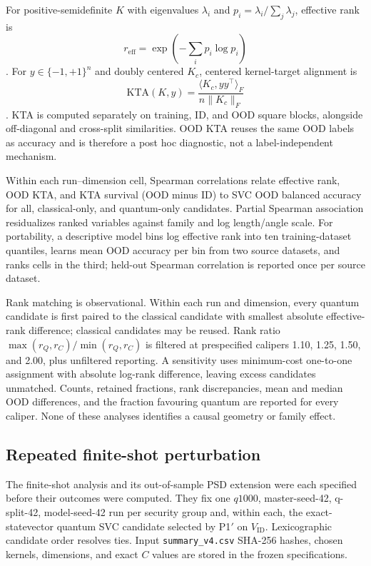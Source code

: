 \documentclass[referee,lineno,pdflatex,sn-nature]{sn-jnl}
\theoremstyle{thmstyleone}%
\theoremstyle{thmstyletwo}%
\theoremstyle{thmstylethree}%
\begin{document}
For positive-semidefinite $K$ with eigenvalues $\lambda_i$ and $p_i=\lambda_i/\sum_j\lambda_j$, effective rank is
\[
r_{\mathrm{eff}}=\exp\!\left(-\sum_i p_i\log p_i\right)
\]
\cite{roy2007effective}. For $y\in\{-1,+1\}^n$ and doubly centered $K_c$, centered kernel-target alignment is
\[
\mathrm{KTA}(K,y)=
\frac{\langle K_c,yy^\top\rangle_F}{n\|K_c\|_F}
\]
\cite{cristianini2001kta,cortes2012centeredalignment}. KTA is computed separately on training, ID, and OOD square blocks, alongside off-diagonal and cross-split similarities. OOD KTA reuses the same OOD labels as accuracy and is therefore a post hoc diagnostic, not a label-independent mechanism.

Within each run--dimension cell, Spearman correlations relate effective rank, OOD KTA, and KTA survival (OOD minus ID) to SVC OOD balanced accuracy for all, classical-only, and quantum-only candidates. Partial Spearman association residualizes ranked variables against family and log length/angle scale. For portability, a descriptive model bins log effective rank into ten training-dataset quantiles, learns mean OOD accuracy per bin from two source datasets, and ranks cells in the third; held-out Spearman correlation is reported once per source dataset.

Rank matching is observational. Within each run and dimension, every quantum candidate is first paired to the classical candidate with smallest absolute effective-rank difference; classical candidates may be reused. Rank ratio $\max(r_Q,r_C)/\min(r_Q,r_C)$ is filtered at prespecified calipers 1.10, 1.25, 1.50, and 2.00, plus unfiltered reporting. A sensitivity uses minimum-cost one-to-one assignment with absolute log-rank difference, leaving excess candidates unmatched. Counts, retained fractions, rank discrepancies, mean and median OOD differences, and the fraction favouring quantum are reported for every caliper. None of these analyses identifies a causal geometry or family effect.

\subsection{Repeated finite-shot perturbation}

The finite-shot analysis and its out-of-sample PSD extension were each specified before their outcomes were computed. They fix one $q1000$, master-seed-42, q-split-42, model-seed-42 run per security group and, within each, the exact-statevector quantum SVC candidate selected by P1$'$ on $V_{\mathrm{ID}}$. Lexicographic candidate order resolves ties. Input \texttt{summary\_v4.csv} SHA-256 hashes, chosen kernels, dimensions, and exact $C$ values are stored in the frozen specifications.
\end{document}
